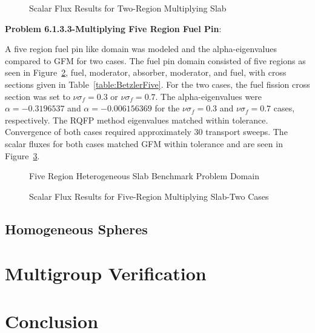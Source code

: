 \begin{figure}[h]
	\centering
	\resizebox{0.5\textwidth}{!}{
	
	}
	\caption{Scalar Flux Results for Two-Region Multiplying Slab}
	\label{fig:TwoRegionMultiply}
\end{figure}

\textbf{Problem 6.1.3.3-Multiplying Five Region Fuel Pin}:

A five region fuel pin like domain was modeled and the alpha-eigenvalues compared to GFM for two cases. The fuel pin domain consisted of five regions as seen in Figure~\ref{fig:FiveRegionProblem}, fuel, moderator, absorber, moderator, and fuel, with cross sections given in Table~\ref{table:BetzlerFive}. For the two cases, the fuel fission cross section was set to $\nu \sigma_{f} = 0.3$ or $\nu \sigma_{f} = 0.7$. The alpha-eigenvalues were $\alpha = -0.3196537$ and $\alpha = -0.006156369$ for the $\nu \sigma_{f} = 0.3$ and $\nu \sigma_{f} = 0.7$ cases, respectively. The RQFP method eigenvalues matched within tolerance. Convergence of both cases required approximately 30 transport sweeps. The scalar fluxes for both cases matched GFM within tolerance and are seen in Figure~\ref{fig:FiveRegionMultiply}.

\begin{figure}[h]
	\centering
	
	\caption{Five Region Heterogeneous Slab Benchmark Problem Domain \cite{kornreich_timeeigenvalue_2005}}
	\label{fig:FiveRegionProblem}
\end{figure}

\begin{figure}[h]
	\centering
	\resizebox{0.5\textwidth}{!}{
	
	}
	\caption{Scalar Flux Results for Five-Region Multiplying Slab-Two Cases}
	\label{fig:FiveRegionMultiply}
\end{figure}

\subsection{Homogeneous Spheres}

\section{Multigroup Verification}

\section{Conclusion}

